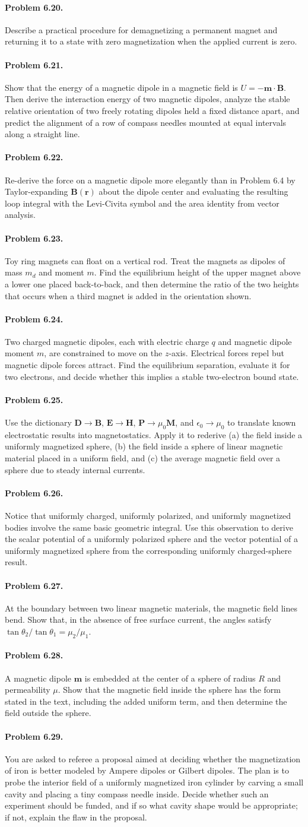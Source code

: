 \documentclass{aa}
\newcommand{\problemstatement}[2]{%
\paragraph{Problem #1.}#2\par\medskip
}
\begin{document}
\problemstatement{6.20}{Describe a practical procedure for demagnetizing a permanent magnet and returning it to a state with zero magnetization when the applied current is zero.}
\problemstatement{6.21}{Show that the energy of a magnetic dipole in a magnetic field is \(U=-\mathbf m\cdot\mathbf B\). Then derive the interaction energy of two magnetic dipoles, analyze the stable relative orientation of two freely rotating dipoles held a fixed distance apart, and predict the alignment of a row of compass needles mounted at equal intervals along a straight line.}
\problemstatement{6.22}{Re-derive the force on a magnetic dipole more elegantly than in Problem 6.4 by Taylor-expanding \(\mathbf B(\mathbf r)\) about the dipole center and evaluating the resulting loop integral with the Levi-Civita symbol and the area identity from vector analysis.}
\problemstatement{6.23}{Toy ring magnets can float on a vertical rod. Treat the magnets as dipoles of mass \(m_d\) and moment \(m\). Find the equilibrium height of the upper magnet above a lower one placed back-to-back, and then determine the ratio of the two heights that occurs when a third magnet is added in the orientation shown.}
\problemstatement{6.24}{Two charged magnetic dipoles, each with electric charge \(q\) and magnetic dipole moment \(m\), are constrained to move on the \(z\)-axis. Electrical forces repel but magnetic dipole forces attract. Find the equilibrium separation, evaluate it for two electrons, and decide whether this implies a stable two-electron bound state.}
\problemstatement{6.25}{Use the dictionary \( \mathbf D \to \mathbf B\), \( \mathbf E \to \mathbf H\), \( \mathbf P \to \mu_0\mathbf M\), and \( \epsilon_0 \to \mu_0\) to translate known electrostatic results into magnetostatics. Apply it to rederive (a) the field inside a uniformly magnetized sphere, (b) the field inside a sphere of linear magnetic material placed in a uniform field, and (c) the average magnetic field over a sphere due to steady internal currents.}
\problemstatement{6.26}{Notice that uniformly charged, uniformly polarized, and uniformly magnetized bodies involve the same basic geometric integral. Use this observation to derive the scalar potential of a uniformly polarized sphere and the vector potential of a uniformly magnetized sphere from the corresponding uniformly charged-sphere result.}
\problemstatement{6.27}{At the boundary between two linear magnetic materials, the magnetic field lines bend. Show that, in the absence of free surface current, the angles satisfy \(\tan\theta_2/\tan\theta_1 = \mu_2/\mu_1\).}
\problemstatement{6.28}{A magnetic dipole \(\mathbf m\) is embedded at the center of a sphere of radius \(R\) and permeability \(\mu\). Show that the magnetic field inside the sphere has the form stated in the text, including the added uniform term, and then determine the field outside the sphere.}
\problemstatement{6.29}{You are asked to referee a proposal aimed at deciding whether the magnetization of iron is better modeled by Ampere dipoles or Gilbert dipoles. The plan is to probe the interior field of a uniformly magnetized iron cylinder by carving a small cavity and placing a tiny compass needle inside. Decide whether such an experiment should be funded, and if so what cavity shape would be appropriate; if not, explain the flaw in the proposal.}
\end{document}
